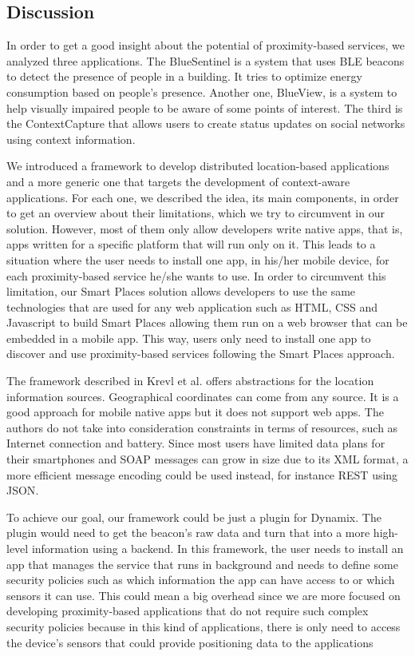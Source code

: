 \subsection{Discussion}
\label{sub:solution_related_work_discussion}
In order to get a good insight about the potential of proximity-based services, we analyzed three applications.
The BlueSentinel is a system that uses \gls{BLE} beacons to detect the presence of people in a building. It tries to optimize energy consumption based on people's presence.
Another one, BlueView, is a system to help visually impaired people to be aware of some points of interest.
The third is the ContextCapture that allows users to create status updates on social networks using context information.

We introduced a framework to develop distributed location-based applications and a more generic one that targets the development of context-aware applications.
For each one, we described the idea, its main components, in order to get an overview about their limitations, which we try to circumvent in our solution.
However, most of them only allow developers write native apps, that is, apps written for a specific platform that will run only on it.
This leads to a situation where the user needs to install one app, in his/her mobile device, for each proximity-based service he/she wants to use.
In order to circumvent this limitation, our Smart Places solution allows developers
to use the same technologies that are used for any web application such as \gls{HTML}, \gls{CSS} and Javascript to build Smart Places allowing them run on a web browser that can be embedded in a mobile app. This way, users only need to install one app to discover and use proximity-based services following the Smart Places approach.

The framework described in Krevl et al.\cite{Krevl2006} offers abstractions for the location information sources.
Geographical coordinates can
come from any source.
It is a good approach for
mobile native apps but it does not support web apps.
The authors do not take into consideration
constraints in terms of resources, such as
Internet connection and battery.
Since most users have limited data plans for
their smartphones and \gls{SOAP} messages can
grow in size due to its \gls{XML} format,
a more efficient message encoding could be used
instead, for instance \gls{REST} using \gls{JSON}.

To achieve our goal, our framework could be just a
plugin for Dynamix. The plugin would
need to get the beacon's raw data and
turn that into a more high-level information
using a backend. In this framework,
the user needs to install an app that manages the service
that runs in background and needs to define some
security policies such as which information the app can have access to or which sensors it can use.
This could mean a big overhead since we are more focused on developing proximity-based applications that do not require such complex security policies because in this kind of applications, there is only need to access the device's sensors that could provide positioning data to the applications

